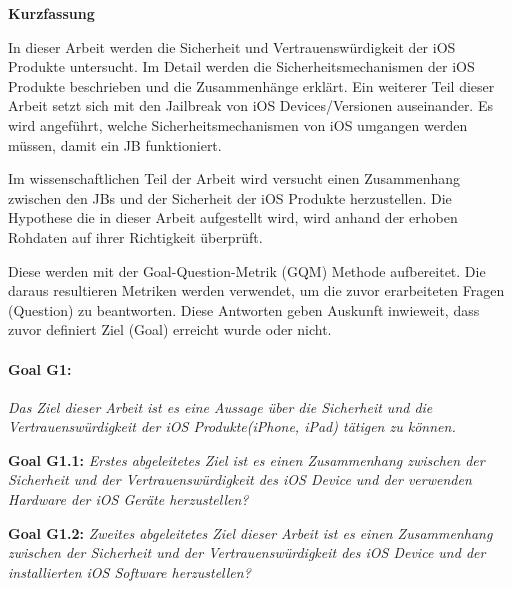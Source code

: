 %
%
% 
% 
% 



\cleardoublepage

\begin{center}
{\Large\bfseries Kurzfassung}
\end{center}
In dieser Arbeit werden die Sicherheit und Vertrauenswürdigkeit der iOS Produkte untersucht. Im Detail werden die Sicherheitsmechanismen der iOS Produkte beschrieben und die Zusammenhänge erklärt. Ein weiterer Teil dieser Arbeit setzt sich mit den Jailbreak von iOS Devices/Versionen auseinander. Es wird angeführt, welche Sicherheitsmechanismen von iOS umgangen werden müssen, damit ein JB funktioniert. \par 
Im wissenschaftlichen Teil der Arbeit wird versucht einen Zusammenhang zwischen den JBs und der Sicherheit der iOS Produkte herzustellen. Die Hypothese die in dieser Arbeit aufgestellt wird, wird anhand der erhoben Rohdaten auf ihrer Richtigkeit überprüft. \par
Diese werden mit der Goal-Question-Metrik (GQM) Methode aufbereitet. Die daraus resultieren Metriken werden verwendet, um die zuvor erarbeiteten Fragen (Question) zu beantworten. Diese Antworten geben Auskunft inwieweit, dass zuvor definiert Ziel (Goal) erreicht wurde oder nicht. \par 

\paragraph{Goal G1:}\textit{\glqq Das Ziel dieser Arbeit ist es eine Aussage über die Sicherheit und die Vertrauenswürdigkeit der iOS Produkte(iPhone, iPad) tätigen zu können.\grqq{}} \par
\textbf{Goal G1.1:} \textit{\glqq Erstes abgeleitetes Ziel ist es einen Zusammenhang zwischen der Sicherheit und der Vertrauenswürdigkeit des iOS Device und der verwenden Hardware der iOS Geräte herzustellen?\grqq{}} \par 
\textbf{Goal G1.2:} \textit{\glqq Zweites abgeleitetes Ziel dieser Arbeit ist es einen Zusammenhang zwischen der Sicherheit und der Vertrauenswürdigkeit des iOS Device und der installierten iOS Software herzustellen?\grqq{}}

